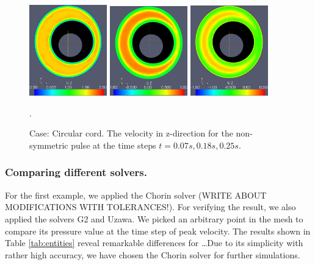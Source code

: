 \begin{figure}\begin{center}
\includegraphics[width=0.3\textwidth]{chapters/haughton/eps_images/pulse_f1_08_sysmax_nmb7.eps}
\includegraphics[width=0.3\textwidth]{chapters/haughton/eps_images/pulse_f1_08_sysdia_nmb18.eps}
\includegraphics[width=0.3\textwidth]{chapters/haughton/eps_images/pulse_f1_08_diamin1_nmb25.eps}
\caption{Case: Circular cord. The velocity in z-direction for the non-symmetric pulse at the time steps $t=0.07s, 0.18s, 0.25s$.}
\label{fig:case1}. 
\end{center}\end{figure}


\subsubsection{Comparing different solvers.}
For the first example, we applied the Chorin solver (WRITE ABOUT MODIFICATIONS WITH TOLERANCES!). For verifying the result, we also applied the solvers G2 and Uzawa. We picked an arbitrary point in the mesh to compare its pressure value at the time step of peak velocity. The results shown in Table \ref{tab:entities} reveal remarkable differences for \ldots Due to its simplicity with rather high accuracy, we have chosen the Chorin solver for further simulations.

